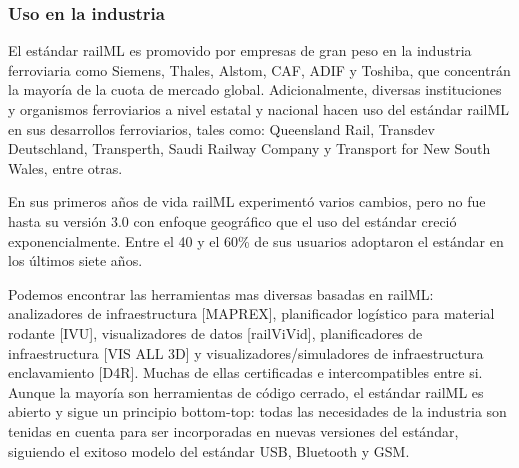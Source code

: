 \subsubsection{Uso en la industria}

    El estándar railML es promovido por empresas de gran peso en la industria ferroviaria como Siemens, Thales, Alstom, CAF, ADIF y Toshiba, que concentrán la mayoría de la cuota de mercado global. Adicionalmente, diversas instituciones y organismos ferroviarios a nivel estatal y nacional hacen uso del estándar railML en sus desarrollos ferroviarios, tales como: Queensland Rail, Transdev Deutschland, Transperth, Saudi Railway Company y Transport for New South Wales, entre otras.

    En sus primeros años de vida railML experimentó varios cambios, pero no fue hasta su versión 3.0 con enfoque geográfico que el uso del estándar creció exponencialmente. Entre el 40 y el 60\% de sus usuarios adoptaron el estándar en los últimos siete años.

    Podemos encontrar las herramientas mas diversas basadas en railML: analizadores de infraestructura [MAPREX], planificador logístico para material rodante [IVU], visualizadores de datos [railViVid], planificadores de infraestructura [VIS ALL 3D] y visualizadores/simuladores de infraestructura enclavamiento [D4R]. Muchas de ellas certificadas e intercompatibles entre si. Aunque la mayoría son herramientas de código cerrado, el estándar railML es abierto y sigue un principio bottom-top: todas las necesidades de la industria son tenidas en cuenta para ser incorporadas en nuevas versiones del estándar, siguiendo el exitoso modelo del estándar USB, Bluetooth y GSM. 